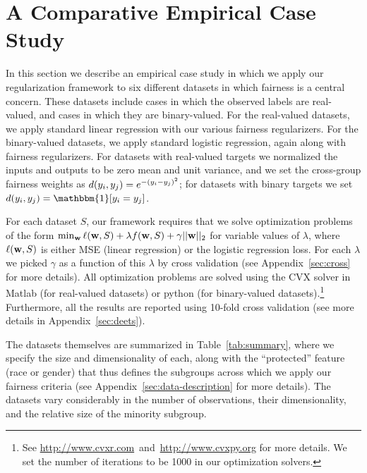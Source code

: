 \section{A Comparative Empirical Case Study}
\label{sec:exp}

In this section we describe an empirical case study in which we
apply our regularization framework to six different datasets
in which fairness is a central concern. These datasets include
cases in which the observed labels are real-valued, and cases in
which they are binary-valued. For the real-valued datasets, we apply
standard linear regression with our various fairness regularizers.
For the binary-valued datasets, we apply standard logistic regression,
again along with fairness regularizers. 
For datasets with real-valued targets we
normalized the inputs and outputs to be zero mean and unit
variance, and we set the cross-group fairness weights as
$d(y_{i}, y_{j}) = e^{-(y_{i}-y_{j})^2}$;
for datasets with binary targets 
we set
$d(\yi,\yj) = \mathbbm{1}[\yi = \yj]$.

For each dataset $S$, our framework requires that we 
solve optimization problems of the
form $\min_{\mathbf{w}} \ell(\mathbf{w},S) + \lambda f(\mathbf{w}, S) + \gamma ||\mathbf{w}||_2$ for
variable values of $\lambda$,
where $\ell(\mathbf{w},S)$ is either MSE (linear regression)
or the logistic regression loss.
For each $\lambda$ we picked $\gamma$ as
a function of this $\lambda$ by cross validation (see Appendix~\ref{sec:cross} for more details).
All optimization
problems are solved using the CVX solver in Matlab (for real-valued datasets) or
python (for binary-valued datasets).\footnote{See \url{http://www.cvxr.com}~and~\url{http://www.cvxpy.org} for more details. We set the number
of iterations to be 1000 in our optimization solvers.}
Furthermore, all the results are reported using 10-fold cross
validation (see more details in Appendix~\ref{sec:deets}).

The datasets themselves are summarized in Table~\ref{tab:summary},
where we specify the size and dimensionality of each, along with 
the ``protected'' feature (race or gender) 
that thus defines the subgroups across which we apply our
fairness criteria (see Appendix~\ref{sec:data-description} for more details). 
The datasets vary considerably in the
number of observations, their dimensionality, and the relative
size of the minority subgroup.

